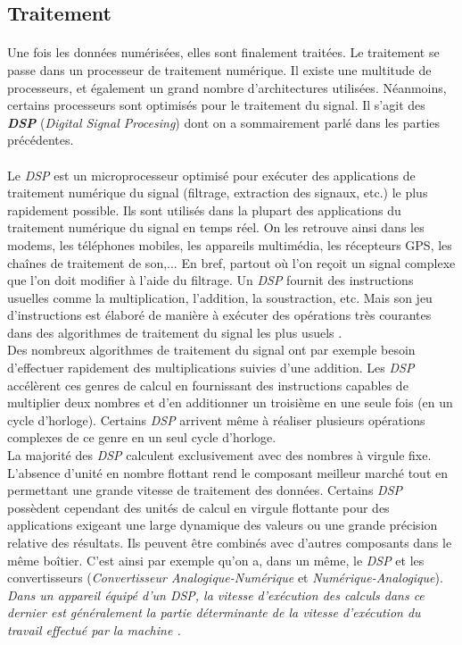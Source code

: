 \subsection{Traitement}
\paragraph{}
Une fois les données numérisées, elles sont finalement traitées. Le traitement se passe dans un processeur de traitement numérique. Il existe une multitude de processeurs, et également un grand nombre d'architectures utilisées. Néanmoins, certains processeurs sont optimisés pour le traitement du signal. Il s'agit des \emph{\textbf{DSP}} (\emph{Digital Signal Procesing}) dont on a sommairement parlé dans les parties précédentes.
\paragraph{}
Le \emph{DSP} est un microprocesseur optimisé pour exécuter des applications de traitement numérique du signal (filtrage, extraction des signaux, etc.) le plus rapidement possible. Ils sont utilisés dans la plupart des applications du traitement numérique du signal en temps réel. On les retrouve ainsi dans les modems, les téléphones mobiles, les appareils multimédia, les récepteurs GPS, les chaînes de traitement de son,... En bref, partout où l'on reçoit un signal complexe que l'on doit modifier à l'aide du filtrage. Un \emph{DSP} fournit des instructions usuelles comme la multiplication, l'addition, la soustraction, etc. Mais son jeu d'instructions est élaboré de manière à exécuter des opérations très courantes dans des algorithmes de traitement du signal les plus usuels \cite{ImageChaineTrait}.\\
Des nombreux algorithmes de traitement du signal ont par exemple besoin d'effectuer rapidement des multiplications suivies d'une addition. Les \emph{DSP} accélèrent ces genres de calcul en fournissant des instructions capables de multiplier deux nombres et d'en additionner un troisième en une seule fois (en un cycle d'horloge). Certains \emph{DSP} arrivent même à réaliser plusieurs opérations complexes de ce genre en un seul cycle d'horloge.\\
La majorité des \emph{DSP} calculent exclusivement avec des nombres à virgule fixe. L'absence d'unité en nombre flottant rend le composant meilleur marché tout en permettant une grande vitesse de traitement des données. Certains \emph{DSP} possèdent cependant des unités de calcul en virgule flottante pour des applications exigeant une large dynamique des valeurs ou une grande précision relative des résultats. Ils peuvent être combinés avec d'autres composants dans le même boîtier. C'est ainsi par exemple qu'on a, dans un même, le \emph{DSP} et les convertisseurs (\emph{Convertisseur Analogique-Numérique} et \emph{Numérique-Analogique}). \emph{Dans un appareil équipé d'un DSP, la vitesse d'exécution des calculs dans ce dernier est généralement la partie déterminante de la vitesse d'exécution du travail effectué par la machine \cite{WikiDSP}.}\newpage

